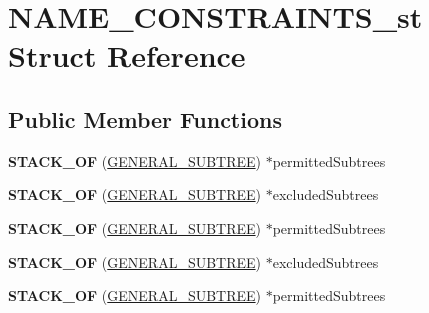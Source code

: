 \hypertarget{structNAME__CONSTRAINTS__st}{}\section{N\+A\+M\+E\+\_\+\+C\+O\+N\+S\+T\+R\+A\+I\+N\+T\+S\+\_\+st Struct Reference}
\label{structNAME__CONSTRAINTS__st}
\subsection*{Public Member Functions}
\begin{DoxyCompactItemize}
\item 
\mbox{\label{structNAME__CONSTRAINTS__st_a018745d61a5d6f8feedf7b6e693cce83}} 
{\bfseries S\+T\+A\+C\+K\+\_\+\+OF} (\hyperlink{structGENERAL__SUBTREE__st}{G\+E\+N\+E\+R\+A\+L\+\_\+\+S\+U\+B\+T\+R\+EE}) $\ast$permitted\+Subtrees
\item 
\mbox{\label{structNAME__CONSTRAINTS__st_a92b0238c5c37f7d919e2fb9d23dd44c2}} 
{\bfseries S\+T\+A\+C\+K\+\_\+\+OF} (\hyperlink{structGENERAL__SUBTREE__st}{G\+E\+N\+E\+R\+A\+L\+\_\+\+S\+U\+B\+T\+R\+EE}) $\ast$excluded\+Subtrees
\item 
\mbox{\label{structNAME__CONSTRAINTS__st_a018745d61a5d6f8feedf7b6e693cce83}} 
{\bfseries S\+T\+A\+C\+K\+\_\+\+OF} (\hyperlink{structGENERAL__SUBTREE__st}{G\+E\+N\+E\+R\+A\+L\+\_\+\+S\+U\+B\+T\+R\+EE}) $\ast$permitted\+Subtrees
\item 
\mbox{\label{structNAME__CONSTRAINTS__st_a92b0238c5c37f7d919e2fb9d23dd44c2}} 
{\bfseries S\+T\+A\+C\+K\+\_\+\+OF} (\hyperlink{structGENERAL__SUBTREE__st}{G\+E\+N\+E\+R\+A\+L\+\_\+\+S\+U\+B\+T\+R\+EE}) $\ast$excluded\+Subtrees
\item 
\mbox{\label{structNAME__CONSTRAINTS__st_a018745d61a5d6f8feedf7b6e693cce83}} 
{\bfseries S\+T\+A\+C\+K\+\_\+\+OF} (\hyperlink{structGENERAL__SUBTREE__st}{G\+E\+N\+E\+R\+A\+L\+\_\+\+S\+U\+B\+T\+R\+EE}) $\ast$permitted\+Subtrees
\item 
\mbox{\label{structNAME__CONSTRAINTS__st_a92b0238c5c37f7d919e2fb9d23dd44c2}} 

\end{DoxyCompactItemize}
